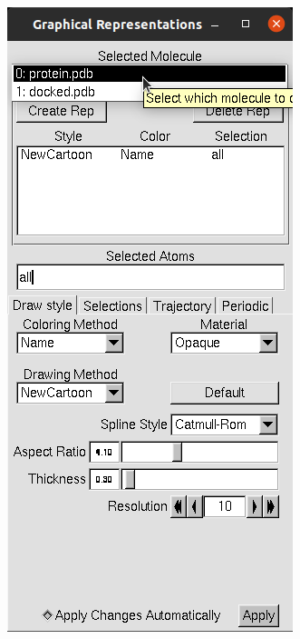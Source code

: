     \begin{figure}[H]
        \centering
        \begin{minipage}{0.45\textwidth}
            \centering
            \includegraphics[height=0.5\textheight]{Graphics/ScreenShots/protein.png}
            \label{fig:protRep}
        \end{minipage}%
        \begin{minipage}{0.45\textwidth}
            \centering

\end{minipage}
\end{figure}

